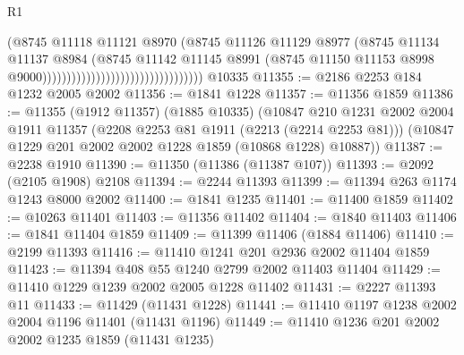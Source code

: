\begin{lexlean}{R1}
\begin{coremodule}
                                                            (@8745
                                                              @11118
                                                              @11121
                                                              @8970
                                                              (@8745
                                                                @11126
                                                                @11129
                                                                @8977
                                                                (@8745
                                                                  @11134
                                                                  @11137
                                                                  @8984
                                                                  (@8745
                                                                    @11142
                                                                    @11145
                                                                    @8991
                                                                    (@8745
                                                                      @11150
                                                                      @11153
                                                                      @8998
                                                                      @9000)))))))))))))))))))))))))))))))))
    @10335
@11355 := @2186 @2253 @184 @1232 @2005 @2002
@11356 := @1841 @1228
@11357 := @11356 @1859
@11386 := @11355
    (@1912 @11357)
    (@1885 @10335)
    (@10847
      @210
      @1231
      @2002
      @2004
      @1911
      @11357
      (@2208 @2253 @81 @1911 (@2213 (@2214 @2253 @81)))
      (@10847 @1229 @201 @2002 @2002 @1228 @1859 (@10868 @1228) @10887))
@11387 := @2238 @1910
@11390 := @11350 (@11386 (@11387 @107))
@11393 := @2092 (@2105 @1908) @2108
@11394 := @2244 @11393
@11399 := @11394 @263 @1174 @1243 @8000 @2002
@11400 := @1841 @1235
@11401 := @11400 @1859
@11402 := @10263 @11401
@11403 := @11356 @11402
@11404 := @1840 @11403
@11406 := @1841 @11404 @1859
@11409 := @11399 @11406 (@1884 @11406)
@11410 := @2199 @11393
@11416 := @11410 @1241 @201 @2936 @2002 @11404 @1859
@11423 := @11394 @408 @55 @1240 @2799 @2002 @11403 @11404
@11429 := @11410 @1229 @1239 @2002 @2005 @1228 @11402
@11431 := @2227 @11393 @11
@11433 := @11429 (@11431 @1228)
@11441 := @11410 @1197 @1238 @2002 @2004 @1196 @11401 (@11431 @1196)
@11449 := @11410 @1236 @201 @2002 @2002 @1235 @1859 (@11431 @1235)

\end{coremodule}
\end{lexlean}
